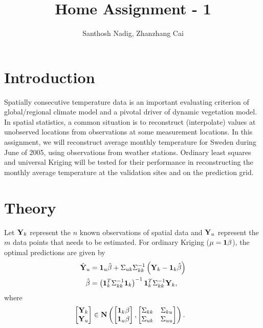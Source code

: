 \documentclass[a4paper,10pt]{article}
\title{Home Assignment - 1}
\author{Santhosh Nadig, Zhanzhang Cai}
\def\bY{{\bf Y}}
\def\b1{{\bf 1}}
\begin{document}
\maketitle

\section{Introduction}
Spatially consecutive temperature data is an important evaluating criterion of global/regional climate model and a pivotal driver of dynamic vegetation model. In spatial statistics, a common situation is to reconstruct (interpolate) values at unobserved locations from observations at some measurement locations. In this assignment, we will reconstruct average monthly temperature for Sweden during June of 2005, using observations from weather stations. Ordinary least squares and universal Kriging will be tested for their performance in reconstructing the monthly average temperature at the validation sites and on the prediction grid.
\section{Theory}
Let $\bY_k$ represent the $n$ known observations of spatial data and $\bY_u$ represent the $m$ data points that needs to be estimated. For ordinary Kriging ($\mu = \b1 \beta$), the optimal predictions are given by
\begin{align*}
 \hat \bY_u &= \b1_u \hat \beta + \Sigma_{uk} \Sigma_{kk}^{-1}\left( \bY_k - \b1_k \hat \beta \right) \\
 \hat \beta &= \left( \b1_k^T \Sigma_{kk}^{-1} \b1_k \right)^{-1} \b1_k^T \Sigma_{kk}^{-1} \bY_k,
\end{align*}
where
\begin{align*}
 &\begin{bmatrix}
  \bY_k \\
  \bY_u
 \end{bmatrix} \in
 \mathbf{N} \left( 
 \begin{bmatrix}
    \b1_k \beta \\
   \b1_u \beta
  \end{bmatrix},
  \begin{bmatrix}
   \Sigma_{kk} & \Sigma_{ku} \\
   \Sigma_{uk} & \Sigma_{uu}
  \end{bmatrix}
  \right).
\end{align*}
\end{document}
